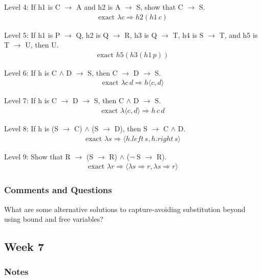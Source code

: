 \documentclass{article}
\theoremstyle{theorem}
\theoremstyle{definition}
\theoremstyle{remark}
\begin{document}
Level 4: If h1 is C $\rightarrow$ A and h2 is A $\rightarrow$ S, show that C $\rightarrow$ S.
\begin{align*}
  \text{exact } \lambda c \Rightarrow h2 (h1 \, c)
\end{align*}

Level 5: If h1 is P $\rightarrow$ Q, h2 is Q $\rightarrow$ R, h3 is Q $\rightarrow$ T, h4 is S $\rightarrow$ T, and h5 is T $\rightarrow$ U, then U.
\begin{align*}
  \text{exact } h5 (h3 (h1 \, p))
\end{align*}

Level 6: If h is C $\wedge$ D $\rightarrow$ S, then C $\rightarrow$ D $\rightarrow$ S.
\begin{align*}
  \text{exact } \lambda c \, d \Rightarrow h \langle c, d \rangle
\end{align*}

Level 7: If h is C $\rightarrow$ D $\rightarrow$ S, then C $\wedge$ D $\rightarrow$ S.
\begin{align*}
  \text{exact } \lambda \langle c, d \rangle \Rightarrow h \, c \, d
\end{align*}

Level 8: If h is (S $\rightarrow$ C) $\wedge$ (S $\rightarrow$ D), then S $\rightarrow$ C $\wedge$ D.
\begin{align*}
  \text{exact } \lambda s \Rightarrow \langle h.left \, s, h.right \, s \rangle
\end{align*}

Level 9: Show that R $\rightarrow$ (S $\rightarrow$ R) $\wedge$ ($\neg$ S $\rightarrow$ R).
\begin{align*}
  \text{exact } \lambda r \Rightarrow \langle \lambda s \Rightarrow r, \lambda s \Rightarrow r \rangle
\end{align*}

\subsubsection{Comments and Questions}
What are some alternative solutions to capture-avoiding substitution beyond using bound and free variables?

\subsection{Week 7}

\subsubsection{Notes}
\end{document}
